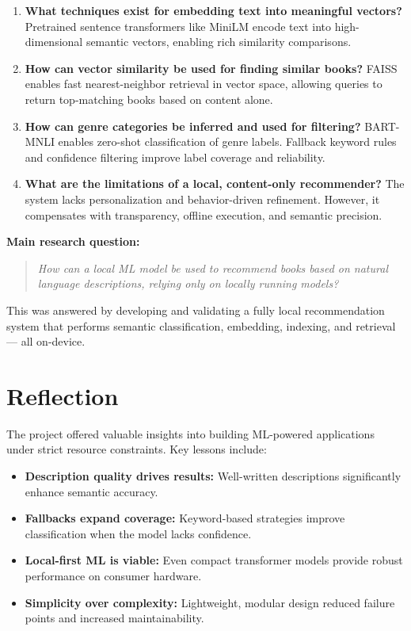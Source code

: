 \begin{enumerate}
    \item \textbf{What techniques exist for embedding text into meaningful vectors?}  
    Pretrained sentence transformers like MiniLM encode text into high-dimensional semantic vectors, enabling rich similarity comparisons.

    \item \textbf{How can vector similarity be used for finding similar books?}  
    FAISS enables fast nearest-neighbor retrieval in vector space, allowing queries to return top-matching books based on content alone.

    \item \textbf{How can genre categories be inferred and used for filtering?}  
    BART-MNLI enables zero-shot classification of genre labels. Fallback keyword rules and confidence filtering improve label coverage and reliability.

    \item \textbf{What are the limitations of a local, content-only recommender?}  
    The system lacks personalization and behavior-driven refinement. However, it compensates with transparency, offline execution, and semantic precision.
\end{enumerate}

\noindent
\textbf{Main research question:}

\begin{quote}
\textit{How can a local ML model be used to recommend books based on natural language descriptions, relying only on locally running models?}
\end{quote}

This was answered by developing and validating a fully local recommendation system that performs semantic classification, embedding, indexing, and retrieval — all on-device.

\section{Reflection}
\label{sec:reflection}

The project offered valuable insights into building ML-powered applications under strict resource constraints. Key lessons include:

\begin{itemize}
    \item \textbf{Description quality drives results:} Well-written descriptions significantly enhance semantic accuracy.
    \item \textbf{Fallbacks expand coverage:} Keyword-based strategies improve classification when the model lacks confidence.
    \item \textbf{Local-first ML is viable:} Even compact transformer models provide robust performance on consumer hardware.
    \item \textbf{Simplicity over complexity:} Lightweight, modular design reduced failure points and increased maintainability.
\end{itemize}

